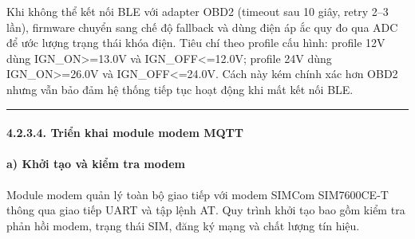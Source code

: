 \documentclass[13pt,a4paper]{extarticle}
\renewcommand{\\}{\thesislongtableorignewline\hline}%
\begin{document}
Khi không thể kết nối BLE với adapter OBD2 (timeout sau 10 giây, retry
2--3 lần), firmware chuyển sang chế độ fallback và dùng điện áp ắc quy
đo qua ADC để ước lượng trạng thái khóa điện. Tiêu chí theo profile cấu
hình: profile 12V dùng IGN\_ON\textgreater=13.0V và
IGN\_OFF\textless=12.0V; profile 24V dùng IGN\_ON\textgreater=26.0V và
IGN\_OFF\textless=24.0V. Cách này kém chính xác hơn OBD2 nhưng vẫn bảo
đảm hệ thống tiếp tục hoạt động khi mất kết nối BLE.

\begin{center}\rule{0.5\linewidth}{0.5pt}\end{center}

\paragraph{4.2.3.4. Triển khai module modem
MQTT}\label{4234-triux1ec3n-khai-module-modem-mqtt}

\paragraph{a) Khởi tạo và kiểm tra
modem}\label{a-khux1edfi-tux1ea1o-vuxe0-kiux1ec3m-tra-modem}

Module modem quản lý toàn bộ giao tiếp với modem SIMCom SIM7600CE-T
thông qua giao tiếp UART và tập lệnh AT. Quy trình khởi tạo bao gồm kiểm
tra phản hồi modem, trạng thái SIM, đăng ký mạng và chất lượng tín hiệu.
\end{document}
